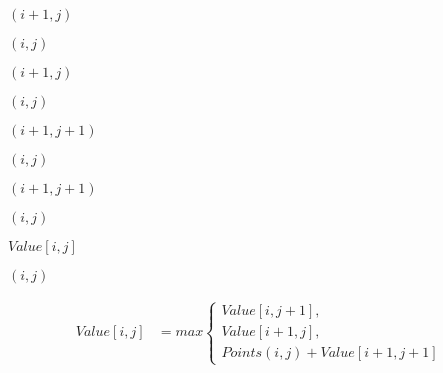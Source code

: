 \documentclass[10pt]{book}
\begin{document}
\begin{mdSnippets}
\begin{mdInlineSnippet}[384d9043006b0a60829e31880377b105]
$(i + 1, j)$\end{mdInlineSnippet}%
\begin{mdInlineSnippet}[3293765967d00230b7f8f3bda30b2cd6]%
$(i, j)$\end{mdInlineSnippet}%
\begin{mdInlineSnippet}[384d9043006b0a60829e31880377b105]%
$(i + 1, j)$\end{mdInlineSnippet}%
\begin{mdInlineSnippet}[3293765967d00230b7f8f3bda30b2cd6]%
$(i, j)$\end{mdInlineSnippet}%
\begin{mdInlineSnippet}[ef5043ffdeee00b319ca0e9f5fc30f23]%
$(i + 1, j + 1)$\end{mdInlineSnippet}%
\begin{mdInlineSnippet}[3293765967d00230b7f8f3bda30b2cd6]%
$(i, j)$\end{mdInlineSnippet}%
\begin{mdInlineSnippet}[ef5043ffdeee00b319ca0e9f5fc30f23]%
$(i + 1, j + 1)$\end{mdInlineSnippet}%
\begin{mdInlineSnippet}[3293765967d00230b7f8f3bda30b2cd6]%
$(i, j)$\end{mdInlineSnippet}%
\begin{mdInlineSnippet}%
$Value[i,j]$\end{mdInlineSnippet}%
\begin{mdInlineSnippet}[3293765967d00230b7f8f3bda30b2cd6]%
$(i, j)$\end{mdInlineSnippet}%
\begin{mdDisplaySnippet}[5d5f9067f9146411129ac2ae4b1b2512]%
\[%
  \begin{aligned}
  Value[i, j] &= max 
  \begin{cases}
    Value[i, j+1],\\
    Value[i+1, j],\\
    Points(i, j) + Value[i+1, j+1]
    \end{cases}
  \end{aligned}
\]%
\end{mdDisplaySnippet}%
\begin{mdInlineSnippet}[76348a1df06ae146ff7c8bceafc4c4b1]%

\end{mdInlineSnippet}
\end{mdSnippets}
\end{document}
